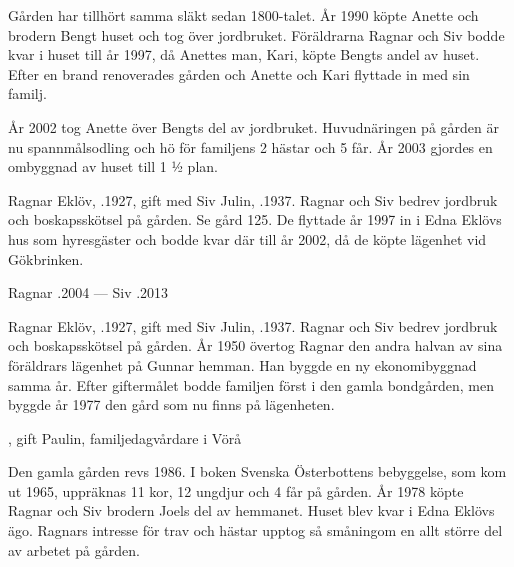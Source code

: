 Gården har tillhört samma släkt sedan 1800-talet. År 1990 köpte Anette och brodern Bengt huset och tog över jordbruket. Föräldrarna Ragnar och Siv bodde kvar i huset till år 1997, då Anettes man, Kari, köpte Bengts andel av huset. Efter en brand renoverades gården och Anette och Kari flyttade in med sin familj.

År 2002 tog Anette över Bengts del av jordbruket. Huvudnäringen på gården är nu spannmålsodling och hö för familjens 2 hästar och 5 får. År 2003 gjordes en ombyggnad av huset till 1 ½ plan.


Ragnar Eklöv, .1927, gift med Siv Julin, .1937. Ragnar och Siv bedrev jordbruk och boskapsskötsel på gården. Se gård 125. De flyttade år 1997 in i Edna Eklövs hus som hyresgäster och bodde kvar där till år 2002, då de köpte lägenhet vid Gökbrinken.

Ragnar .2004  ---  Siv .2013





Ragnar Eklöv, .1927, gift med Siv Julin, .1937. Ragnar och Siv bedrev jordbruk och boskapsskötsel på gården. År 1950 övertog Ragnar den andra halvan av sina föräldrars lägenhet på Gunnar hemman. Han byggde en ny ekonomibyggnad samma år. Efter giftermålet bodde familjen först i den gamla bondgården, men byggde år 1977 den gård som nu finns på lägenheten.
\begin{jhchildren}
  \item {}
  \item {}
  \item {}, gift Paulin, familjedagvårdare i Vörå
\end{jhchildren}

Den gamla gården revs 1986. I boken Svenska Österbottens bebyggelse, som  kom ut 1965, uppräknas 11 kor, 12 ungdjur och 4 får på gården. År 1978 köpte Ragnar och Siv brodern Joels del av hemmanet. Huset blev kvar i Edna Eklövs ägo. Ragnars intresse för trav och hästar upptog så småningom en allt större del av arbetet på gården.


